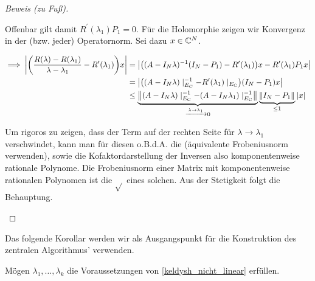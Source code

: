 \begin{proof}[Beweis (zu Fuß)]
\begin{enumerate}[label = (\roman*)]
        Offenbar gilt damit $R^\prime(\lambda_1) P_1 = 0$.
        Für die Holomorphie zeigen wir Konvergenz in der (bzw. jeder) Operatornorm.
        Sei dazu $x \in \mathbb{C}^N$.

        \begin{align*}
            \implies
            {\left | 
                {\left ( 
                    \frac
                    {
                        R(\lambda) - R(\lambda_1)
                    }{
                        \lambda - \lambda_1
                    }
                    -
                    R^\prime(\lambda_1)
                 \right )}
                x
             \right |}
            & =
            {\left | 
                {\left ( 
                    (A - I_N \lambda)^{-1} (I_N - P_1)
                    -
                    R^\prime(\lambda_1)
                 \right )}
                x
                -
                R^\prime(\lambda_1) P_1 x
             \right |} \\
            & =
            {\left | 
                {\left ( 
                    (A - I_N \lambda) \mid_{E_\mathrm{C}}^{-1}
                    -
                    R^\prime(\lambda_1) \mid_{E_\mathrm{C}}
                 \right )}
                (I_N - P_1)
                x
             \right |} \\
            & \leq
            \underbrace
            {
                {\left \| 
                    (A - I_N \lambda)   \mid_{E_\mathrm{C}}^{-1}
                    -
                    (A - I_N \lambda_1) \mid_{E_\mathrm{C}}^{-1}
                 \right \|}_{}
            }_{
                \xrightarrow{\lambda \to \lambda_1} 0
            }
            \underbrace
            {
                {\left \| I_N - P_1 \right \|}_{}
            }_{
                \leq 1
            }
            |x|
        \end{align*}

        Um rigoros zu zeigen, dass der Term auf der rechten Seite für $\lambda \to \lambda_1$ verschwindet, kann man für diesen o.B.d.A. die (äquivalente Frobeniusnorm verwenden), sowie die Kofaktordarstellung der Inversen also komponentenweise rationale Polynome.
        Die Frobeniusnorm einer Matrix mit komponentenweise rationalen Polynomen ist die $\sqrt{}$ eines solchen.
        Aus der Stetigkeit folgt die Behauptung.

    \end{enumerate}

\end{proof}

Das folgende Korollar werden wir als Ausgangspunkt für die Konstruktion des zentralen Algorithmus' verwenden.

\begin{corollary}

    Mögen $\lambda_1, \dots, \lambda_k$ die Voraussetzungen von \ref{keldysh_nicht_linear} erfüllen.

\end{corollary}